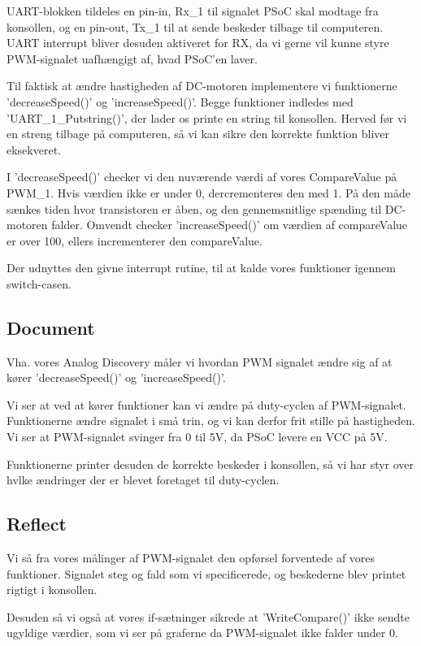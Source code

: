 \documentclass[../main.tex]{subfiles}
\begin{document}
UART-blokken tildeles en pin-in, Rx\_1 til signalet PSoC skal modtage fra konsollen, og en pin-out, Tx\_1 til at sende beskeder tilbage til computeren. UART interrupt bliver desuden aktiveret for RX, da vi gerne vil kunne styre PWM-signalet uafhængigt af, hvad PSoC'en laver.

Til faktisk at ændre hastigheden af DC-motoren implementere vi funktionerne ’decreaseSpeed()’ og ’increaseSpeed()’. Begge funktioner indledes med ’UART\_1\_Putstring()’, der lader os printe en string til konsollen. Herved før vi en streng tilbage på computeren, så vi kan sikre den korrekte funktion bliver eksekveret.


I ’decreaseSpeed()’ checker vi den nuværende værdi af vores CompareValue på PWM\_1. Hvis værdien ikke er under 0, dercrementeres den med 1. På den måde sænkes tiden hvor transistoren er åben, og den gennemsnitlige spænding til DC-motoren falder. Omvendt checker 'increaseSpeed()' om værdien af compareValue er over 100, ellers incrementerer den compareValue.

Der udnyttes den givne interrupt rutine, til at kalde vores funktioner igennem switch-casen.

\subsection{Document}
Vha. vores Analog Discovery måler vi hvordan PWM signalet ændre sig af at kører ’decreaseSpeed()’ og ’increaseSpeed()’.


Vi ser at ved at kører funktioner kan vi ændre på duty-cyclen af PWM-signalet. Funktionerne ændre signalet i små trin, og vi kan derfor frit stille på hastigheden. Vi ser at PWM-signalet svinger fra 0 til 5V, da PSoC levere en VCC på 5V.

Funktionerne printer desuden de korrekte beskeder i konsollen, så vi har styr over hvlke ændringer der er blevet foretaget til duty-cyclen.

\subsection{Reflect}    
Vi så fra vores målinger af PWM-signalet den opførsel forventede af vores funktioner. Signalet steg og fald som vi specificerede, og beskederne blev printet rigtigt i konsollen.

Desuden så vi også at vores if-sætninger sikrede at ’WriteCompare()’ ikke sendte ugyldige værdier, som vi ser på graferne da PWM-signalet ikke falder under 0.
\end{document}
